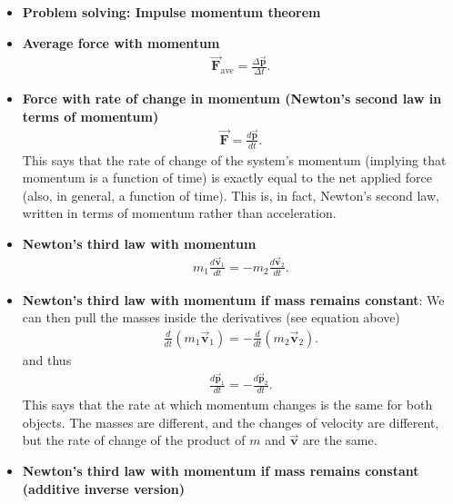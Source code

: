 \documentclass{report}
\begin{document}
\begin{itemize}
\begin{itemize}
            \end{itemize}
        \item \textbf{Problem solving: Impulse momentum theorem}
        \item \textbf{Average force with momentum}
            \begin{align*}
                \vec{\mathbf{F}}_{\text{ave}} = \frac{\Delta \vec{\mathbf{p}}}{\Delta t}
            .\end{align*}
        \item \textbf{Force with rate of change in momentum (Newton's second law in terms of momentum)}
            \begin{align*}
                \vec{\mathbf{F}} = \frac{d\vec{\mathbf{p}}}{dt}
            .\end{align*}
            \bigbreak \noindent 
            This says that the rate of change of the system’s momentum (implying that momentum is a function of time) is exactly equal to the net applied force (also, in general, a function of time). This is, in fact, Newton’s second law, written in terms of momentum rather than acceleration.
        \item \textbf{Newton's third law with momentum}
            \begin{align*}
                m_{1} \frac{d\vec{\mathbf{v}}_{1}}{dt} = -m_{2} \frac{d\vec{\mathbf{v}}_{2}}{dt}
            .\end{align*}
        \item \textbf{Newton's third law with momentum if mass remains constant}: We can then pull the masses inside the derivatives (see equation above)
            \begin{align*}
               \frac{d}{dt}(m_{1}\vec{\mathbf{v}}_{1}) = -\frac{d}{dt}(m_{2}\vec{\mathbf{v}}_{2}) 
            .\end{align*}
            and thus
            \begin{align*}
                \frac{d\vec{\mathbf{p}}_{1}}{dt} = - \frac{d\vec{\mathbf{p}}_{2}}{dt}
            .\end{align*}
            \bigbreak \noindent 
            This says that the rate at which momentum changes is the same for both objects. The masses are different, and the changes of velocity are different, but the rate of change of the product of $m$ and  $\vec{\mathbf{v}}$ are the same.
        \item \textbf{Newton's third law with momentum if mass remains constant (additive inverse version)}
            \begin{align*}

\end{align*}
\end{itemize}
\end{document}
